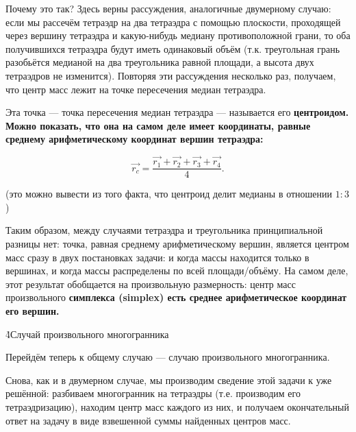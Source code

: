 Почему это так? Здесь верны рассуждения, аналогичные двумерному случаю: если мы рассечём тетраэдр на два тетраэдра с помощью плоскости, проходящей через вершину тетраэдра и какую-нибудь медиану противоположной грани, то оба получившихся тетраэдра будут иметь одинаковый объём (т.к. треугольная грань разобьётся медианой на два треугольника равной площади, а высота двух тетраэдров не изменится). Повторяя эти рассуждения несколько раз, получаем, что центр масс лежит на точке пересечения медиан тетраэдра.

Эта точка --- точка пересечения медиан тетраэдра --- называется его \bf{центроидом}. Можно показать, что она на самом деле имеет координаты, равные среднему арифметическому координат вершин тетраэдра:

$$ \vec{r_c} = \frac{ \vec{r_1} + \vec{r_2} + \vec{r_3} + \vec{r_4} }{ 4 }. $$

(это можно вывести из того факта, что центроид делит медианы в отношении $1:3$)

Таким образом, между случаями тетраэдра и треугольника принципиальной разницы нет: точка, равная среднему арифметическому вершин, является центром масс сразу в двух постановках задачи: и когда массы находится только в вершинах, и когда массы распределены по всей площади/объёму. На самом деле, этот результат обобщается на произвольную размерность: центр масс произвольного \bf{симплекса} (simplex) есть среднее арифметическое координат его вершин.

\h4{Случай произвольного многогранника}

Перейдём теперь к общему случаю --- случаю произвольного многогранника.

Снова, как и в двумерном случае, мы производим сведение этой задачи к уже решённой: разбиваем многогранник на тетраэдры (т.е. производим его тетраэдризацию), находим центр масс каждого из них, и получаем окончательный ответ на задачу в виде взвешенной суммы найденных центров масс.

